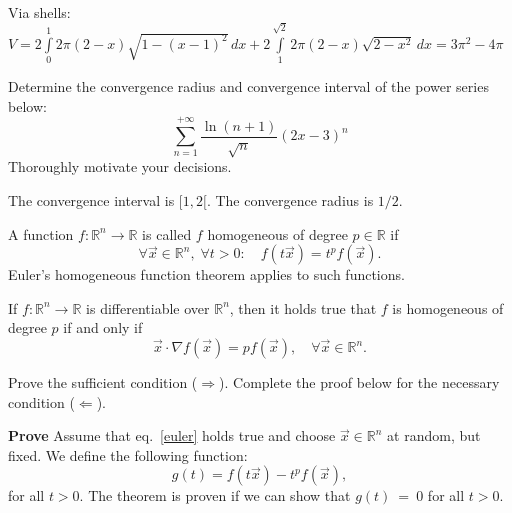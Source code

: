 \begin{Answer}\phantom{}
Via shells: $V = 2 \displaystyle \int \limits_0^1 2 \pi (2-x) \sqrt{1 - (x-1)^2} \, dx + 2 \displaystyle \int \limits_1^{\sqrt{2}} 2 \pi (2-x) \sqrt{2-x^2} \, dx  =3 \pi^2 - 4 \pi$

\end{Answer}

\begin{Exercise} %
Determine the convergence radius and convergence interval of the power series below:
$$
\sum\limits_{n=1}^{+\infty}\dfrac{\ln(n+1)}{\sqrt{n}}(2x-3)^n
$$
Thoroughly motivate your decisions. 
\end{Exercise} 
The convergence interval is $[1,2[$. The convergence radius is $1/2$. 

\begin{Exercise} %
A function $f:\mathbb{R}^n \rightarrow \mathbb{R}$  is called $f$ homogeneous of degree $p \in \mathbb{R}$ if 
\begin{equation}
\forall \vec{x} \in \mathbb{R}^n, \; \forall t>0: \quad f(t\vec{x}) = t^p f(\vec{x}).
\label{homogeen}
\end{equation}
Euler's homogeneous function theorem applies to such functions.

\begin{theorem}\label{thm:euler}
If $f:\mathbb{R}^n \rightarrow \mathbb{R}$ is differentiable over $\mathbb{R}^n$, then it holds true that
$f$ is homogeneous of degree $p$ if and only if
\begin{equation}
\vec{x} \cdot \nabla f(\vec{x}) = p f(\vec{x}), \quad \forall \vec{x} \in \mathbb{R}^n.
\label{euler}
\end{equation}
\end{theorem}
\Question Prove the sufficient condition ($\Longrightarrow$).
\Question Complete the proof below for the necessary condition ($\Longleftarrow$). 
    
\vspace*{1cm} 
\textbf{Prove} Assume that eq.~\eqref{euler} holds true and choose $\vec{x}\in\mathbb{R}^n$ at random, but fixed. We define the following function:
$$
g(t) = f(t\vec{x}) - t^p f(\vec{x}),
$$
for all $t>0$. The theorem is proven if we can show that $g(t)~=~0$ for all $t>0$. 


\end{Exercise}
